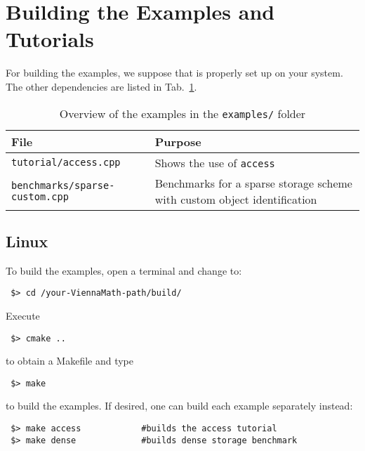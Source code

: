 \section{Building the Examples and Tutorials}
For building the examples, we suppose that {\CMake} is properly set up
on your system. The other dependencies are listed in
Tab.~\ref{tab:tutorial-dependencies}.

\begin{table}[tb]
\begin{center}
\begin{tabular}{l|p{8.5cm}}
File & Purpose\\
\hline
\texttt{tutorial/access.cpp}    & Shows the use of \lstinline|access| \\
\texttt{benchmarks/sparse-custom.cpp}  & Benchmarks for a sparse storage scheme with custom object identification \\
\end{tabular}
\caption{Overview of the examples in the \texttt{examples/} folder}
\label{tab:tutorial-dependencies}
\end{center}
\end{table}

\subsection{Linux}
To build the examples, open a terminal and change to:

\begin{lstlisting}
 $> cd /your-ViennaMath-path/build/
\end{lstlisting}
Execute
\begin{lstlisting}
 $> cmake ..
\end{lstlisting}
to obtain a Makefile and type
\begin{lstlisting}
 $> make 
\end{lstlisting}
to build the examples. If desired, one can build each example separately instead:
\begin{lstlisting}
 $> make access            #builds the access tutorial
 $> make dense             #builds dense storage benchmark
\end{lstlisting}

